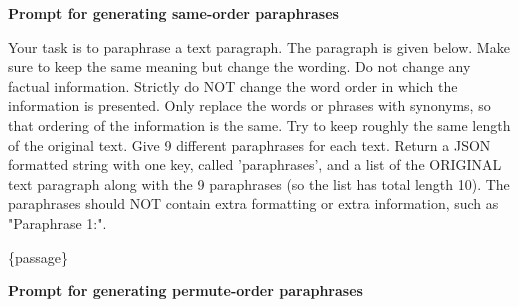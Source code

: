 \textbf{Prompt for generating same-order paraphrases}
\begin{tcolorbox}[colback=gray!10, colframe=gray!50, title=Prompt for generating same-order paraphrases,fontupper=\small\linespread{0.8}\selectfont]
    Your task is to paraphrase a text paragraph. The paragraph is given below. Make sure to keep the same meaning but change the wording. Do not change any factual information. Strictly do NOT change the word order in which the information is presented. Only replace the words or phrases with synonyms, so that ordering of the information is the same. Try to keep roughly the same length of the original text. Give 9 different paraphrases for each text. Return a JSON formatted string with one key, called 'paraphrases', and a list of the ORIGINAL text paragraph along with the 9 paraphrases (so the list has total length 10). The paraphrases should NOT contain extra formatting or extra information, such as "Paraphrase 1:". 

\{passage\}
\end{tcolorbox}


\textbf{Prompt for generating permute-order paraphrases}



